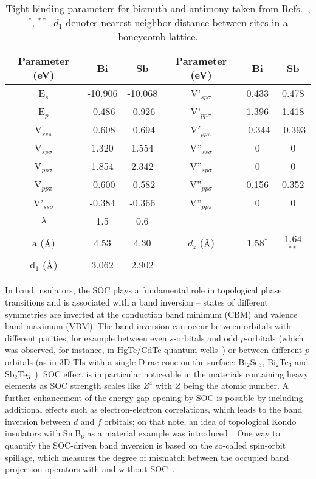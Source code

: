 \begin{table}[H]
\centering
\begin{tabular}{|c|c|c||c|c|c|}
\hline 
Parameter (eV) & Bi & Sb & Parameter (eV)  & Bi & Sb \\ \hline
E$_{s}$ & -10.906 & -10.068 & V'$_{sp\sigma}$ & 0.433 & 0.478 \\ 
E$_{p}$ & -0.486 & -0.926 & V'$_{pp\sigma}$  & 1.396 & 1.418  \\
V$_{ss\pi}$ & -0.608 & -0.694 & V$'_{pp\pi}$ & -0.344 & -0.393 \\
V$_{sp\sigma}$ & 1.320 & 1.554 & V''$_{ss\sigma}$ & 0 & 0 \\
V$_{pp\sigma}$ & 1.854 & 2.342 & V''$_{sp\sigma}$ & 0 & 0\\
V$_{pp\pi}$& -0.600 & -0.582 & V''$_{pp\sigma}$ & 0.156 & 0.352 \\
V'$_{ss\sigma}$& -0.384 & -0.366 & V''$_{pp\pi}$ & 0 & 0\\
$\lambda$ & 1.5 & 0.6 &   & & \\
\hline
a ($\textnormal{\AA}$) & 4.53 & 4.30 & $d_z$ ($\textnormal{\AA}$) & 1.58$^{*}$ & 1.64$^{**}$ \\
d$_1$ ($\textnormal{\AA}$) & 3.062 & 2.902 &  &  &\\
\hline
\end{tabular} 
\caption[Tight-binding parameters for bismuth and antimony taken]{Tight-binding parameters for bismuth and antimony taken from Refs.~\cite{Liu:Allen}, \cite{stable:bi111}$^*$, \cite{Sb:nontriv}$^{**}$. $d_1$ denotes nearest-neighbor distance between sites in a honeycomb lattice.}
\label{tab:TB}
\end{table}

In band insulators, the SOC plays a fundamental role in topological phase transitions and is associated with a band inversion -- states of different symmetries are inverted at the conduction band minimum (CBM) and valence band maximum (VBM). The band inversion can occur between orbitals with different parities, for example between even $s$-orbitals and odd $p$-orbitals (which was observed, for instance, in HgTe/CdTe quantum wells~\cite{MolenkampQSHE2007}) or between different $p$ orbitals (as in 3D TIs with a single Dirac cone on the surface: Bi$_2$Se$_3$, Bi$_2$Te$_3$ and Sb$_2$Te$_3$~\cite{Zhang2009}). SOC effect is in particular noticeable in the materials containing heavy elements as SOC strength scales like $Z^4$ with $Z$ being the atomic number. A further enhancement of the energy gap opening by SOC is possible by including additional effects such as electron-electron correlations, which leads to the band inversion between $d$ and $f$ orbitals; on that note, an idea of topological Kondo insulators with SmB$_6$ as a material example was introduced~\cite{doi:10.1146/annurev-conmatphys-031214-014749}. One way to quantify the SOC-driven band inversion is based on the so-called spin-orbit spillage, which measures the degree of mismatch between the occupied band projection operators with and without SOC~\cite{SOCspillage}.


